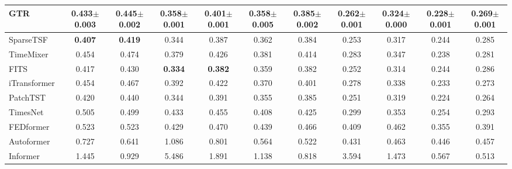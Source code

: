 {\begin{tabular}{lcccccccccc}
GTR & 0.433{\tiny$\pm$0.003} & 0.445{\tiny$\pm$0.002} & 0.358{\tiny$\pm$0.001} & 0.401{\tiny$\pm$0.001} & \textcolor[HTML]{0000FF}{0.358{\tiny$\pm$0.005}} & \textcolor[HTML]{0000FF}{0.385{\tiny$\pm$0.002}} & 0.262{\tiny$\pm$0.001} & 0.324{\tiny$\pm$0.000} & 0.228{\tiny$\pm$0.001} & 0.269{\tiny$\pm$0.001}\\
\midrule
SparseTSF~\cite{Lin2024SparseTSF} & \textcolor[HTML]{FF0000}{\textbf{0.407}} & \textcolor[HTML]{FF0000}{\textbf{0.419}} & 0.344 & 0.387 & 0.362 & \textcolor[HTML]{0000FF}{0.384} & 0.253 & 0.317 & 0.244 & 0.285\\
TimeMixer~\cite{Wang2024TimeMixer} & 0.454 & 0.474 & 0.379 & 0.426 & 0.381 & 0.414 & 0.283 & 0.347 & 0.238 & 0.281\\
FITS~\cite{Xu2024FITS} & 0.417 & 0.430 & \textcolor[HTML]{FF0000}{\textbf{0.334}} & \textcolor[HTML]{FF0000}{\textbf{0.382}} & 0.359 & \textcolor[HTML]{0000FF}{0.382} & 0.252 & 0.314 & 0.244 & 0.286\\
iTransformer~\cite{Liu2024iTransformer} & 0.454 & 0.467 & 0.392 & 0.422 & 0.370 & 0.401 & 0.278 & 0.338 & 0.233 & 0.273\\
PatchTST~\cite{Nie2023PatchTST} & 0.420 & 0.440 & 0.344 & 0.391 & \textcolor[HTML]{0000FF}{0.355} & 0.385 & 0.251 & 0.319 & 0.224 & 0.264\\
TimesNet~\cite{Wu2023TimesNet} & 0.505 & 0.499 & 0.433 & 0.455 & 0.408 & 0.425 & 0.299 & 0.353 & 0.254 & 0.293\\
FEDformer~\cite{Zhou2022FEDformer} & 0.523 & 0.523 & 0.429 & 0.470 & 0.439 & 0.466 & 0.409 & 0.462 & 0.355 & 0.391\\
Autoformer~\cite{Wu2021Autoformer} & 0.727 & 0.641 & 1.086 & 0.801 & 0.564 & 0.522 & 0.431 & 0.463 & 0.446 & 0.457\\
Informer~\cite{Zhou2021Informer} & 1.445 & 0.929 & 5.486 & 1.891 & 1.138 & 0.818 & 3.594 & 1.473 & 0.567 & 0.513\\
\bottomrule
\end{tabular}}
